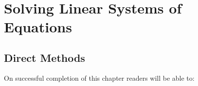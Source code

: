 \documentclass[letterpaper,10pt,english]{jupyterBook}
\begin{document}
\sphinxstepscope


\part{Solving Linear Systems of Equations}

\sphinxstepscope


\chapter{Direct Methods}
\label{\detokenize{6_Direct_methods/6.0_Direct_methods:direct-methods}}\label{\detokenize{6_Direct_methods/6.0_Direct_methods:direct-methods-chapter}}\label{\detokenize{6_Direct_methods/6.0_Direct_methods::doc}}
\sphinxAtStartPar
{}

\sphinxAtStartPar
On successful completion of this chapter readers will be able to:
\end{document}
